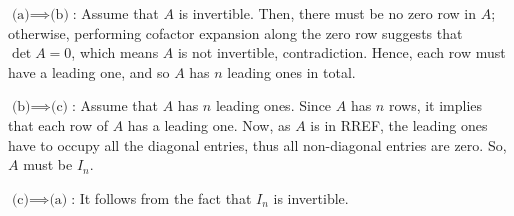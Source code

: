 \begin{enumerate}
\begin{pf}
\underline{\(\text{(a)}\implies \text{(b)}\)}: Assume that \(A\) is invertible.
Then, there must be no zero row in \(A\); otherwise, performing cofactor
expansion along the zero row suggests that \(\det A=0\), which means \(A\) is
not invertible, contradiction. Hence, each row must have a leading one, and so
\(A\) has \(n\) leading ones in total.

\underline{\(\text{(b)}\implies \text{(c)}\)}: Assume that \(A\) has \(n\)
leading ones. Since \(A\) has \(n\) rows, it implies that each row of \(A\) has
a leading one. Now, as \(A\) is in RREF, the leading ones have to occupy all
the diagonal entries, thus all non-diagonal entries are zero. So,
\(A\) must be \(I_n\).

\underline{\(\text{(c)}\implies \text{(a)}\)}: It follows from the fact that
\(I_n\) is invertible.
\end{pf}
\end{enumerate}
